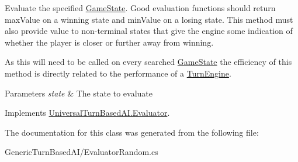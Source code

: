 Evaluate the specified \hyperlink{class_universal_turn_based_a_i_1_1_game_state}{Game\+State}. Good evaluation functions should return max\+Value on a winning state and min\+Value on a losing state. This method must also provide value to non-\/terminal states that give the engine some indication of whether the player is closer or further away from winning. 

As this will need to be called on every searched \hyperlink{class_universal_turn_based_a_i_1_1_game_state}{Game\+State} the efficiency of this method is directly related to the performance of a \hyperlink{class_universal_turn_based_a_i_1_1_turn_engine}{Turn\+Engine}. 


\begin{DoxyParams}{Parameters}
{\em state} & The state to evaluate\\
\hline
\end{DoxyParams}


Implements \hyperlink{class_universal_turn_based_a_i_1_1_evaluator_a949d4c3583870a45dc136f1e46114c99}{Universal\+Turn\+Based\+A\+I.\+Evaluator}.



The documentation for this class was generated from the following file\+:\begin{DoxyCompactItemize}
\item 
Generic\+Turn\+Based\+A\+I/Evaluator\+Random.\+cs\end{DoxyCompactItemize}
